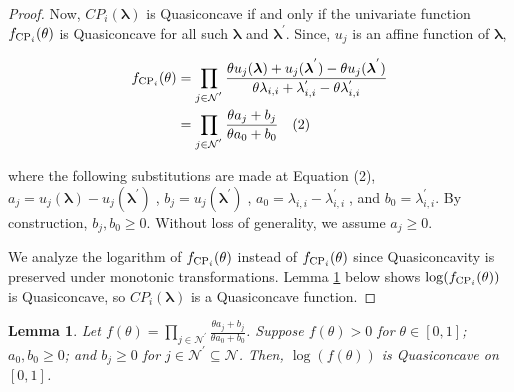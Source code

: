 \documentclass[letterpaper]{article} %
\newtheorem{lemma}{Lemma}
\theoremstyle{definition}
\begin{document}
\begin{proof}
\noindent Now, $CP_i(\boldsymbol{\lambda})$ is Quasiconcave if and only if the univariate function $f_{\textnormal{CP}_{i}}(\theta)$ is Quasiconcave for all such $\boldsymbol{\lambda}$ and $\boldsymbol{\lambda}^{'}$. Since, $u_{j}$ is an affine function of $\boldsymbol{\lambda}$,

\begin{linenomath}
\begin{equation*} \label{cp_univariate_eq1}
\begin{split}
f_{\textnormal{CP}_{i}}(\theta) & = \displaystyle \prod_{j \in \mathcal{N}^{'}} \displaystyle \frac{ \theta u_{j}(\boldsymbol{\lambda}) +  u_{j}(\boldsymbol{\lambda}^{'}) - \theta u_{j}(\boldsymbol{\lambda}^{'})}{\theta \lambda_{i,i} +  \lambda^{'}_{i,i} - \theta \lambda^{'}_{i,i}} \\
& = \displaystyle \prod_{j \in \mathcal{N}^{'}} \displaystyle \frac{\theta a_{j} + b_{j}}{\theta a_{0} + b_{0}} \quad \textnormal{(2)}
\end{split}
\end{equation*}
\end{linenomath}

\noindent where the following substitutions are made at Equation (2), $a_{j} = u_{j}(\boldsymbol{\lambda}) - u_{j}(\boldsymbol{\lambda}^{'})\;$, $b_{j} = u_{j}(\boldsymbol{\lambda}^{'})\;$, $a_{0} = \lambda_{i,i} - \lambda^{'}_{i,i}\;$, and $b_{0} = \lambda^{'}_{i,i}$. By construction, $b_{j}, b_{0}\geq 0$. Without loss of generality, we assume $a_{j} \geq 0$.

We analyze the logarithm of $f_{\textnormal{CP}_{i}}(\theta)$ instead of $f_{\textnormal{CP}_{i}}(\theta)$ since Quasiconcavity is preserved under monotonic transformations. Lemma \ref{cost-prod2} below shows $\log(f_{\textnormal{CP}_{i}}(\theta))$ is Quasiconcave, so $CP_{i}(\boldsymbol{\lambda})$ is a Quasiconcave function.
\end{proof}

\begin{lemma} \label{cost-prod2}
Let $f(\theta) = \displaystyle \prod_{j \in \mathcal{N}^{'}} \displaystyle \frac{\theta a_{j} + b_{j}}{\theta a_{0} + b_{0}}$.  Suppose $f(\theta) > 0$ for $\theta \in [0,1]$; $a_{0}, b_{0} \geq 0$; and $b_{j} \geq 0$ for $j \in \mathcal{N}^{'}\subseteq \mathcal{N}$. Then, $\log(f(\theta))$ is Quasiconcave on $[0,1]$.
\end{lemma}
\end{document}
